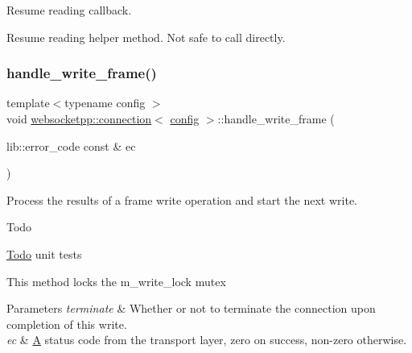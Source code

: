 Resume reading callback. 

Resume reading helper method. Not safe to call directly. \mbox{\label{classwebsocketpp_1_1connection_a867f94b82788e978ea116d50cf83d72e}} 
\subsubsection{\texorpdfstring{handle\+\_\+write\+\_\+frame()}{handle\_write\_frame()}}
{\footnotesize\ttfamily template$<$typename config $>$ \\
void \mbox{\hyperlink{classwebsocketpp_1_1connection}{websocketpp\+::connection}}$<$ \mbox{\hyperlink{classconfig}{config}} $>$\+::handle\+\_\+write\+\_\+frame (\begin{DoxyParamCaption}\item[{lib\+::error\+\_\+code const \&}]{ec }\end{DoxyParamCaption})}



Process the results of a frame write operation and start the next write. 

\begin{DoxyRefDesc}{Todo}
\item[\mbox{\hyperlink{todo__todo000007}{Todo}}]unit tests\end{DoxyRefDesc}


This method locks the m\+\_\+write\+\_\+lock mutex


\begin{DoxyParams}{Parameters}
{\em terminate} & Whether or not to terminate the connection upon completion of this write.\\
\hline
{\em ec} & \mbox{\hyperlink{struct_a}{A}} status code from the transport layer, zero on success, non-\/zero otherwise. \\
\hline
\end{DoxyParams}
\mbox{\label{classwebsocketpp_1_1connection_ac1c576bd4dfebac977eade9ac637a432}} 
